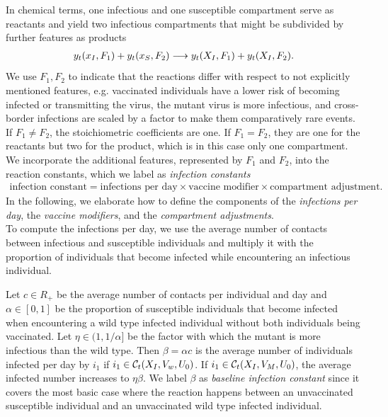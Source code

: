 In chemical terms, one infectious and one susceptible compartment serve as reactants and yield two infectious compartments that might be subdivided by further features as products
\begin{align}
\label{eq:general_infection}
y_t(x_I, F_1) + y_t(x_S, F_2) \longrightarrow y_t(X_I, F_1) + y_t(X_I, F_2).
\end{align}
We use $F_1, F_2$ to indicate that the reactions differ with respect to not explicitly mentioned features, e.g. vaccinated individuals have a lower risk of becoming infected or transmitting the virus, the mutant virus is more infectious, and cross-border infections are scaled by a factor to make them comparatively rare events. If $F_1 \neq F_2$, the stoichiometric coefficients are one. If $F_1=F_2$, they are one for the reactants but two for the product, which is in this case only one compartment. We incorporate the additional features, represented by $F_1$ and $F_2$, into the reaction constants, which we label as \textit{infection constants}
\begin{align*}
\text{infection constant} = \text{infections per day} \times \text{vaccine modifier} \times \text{compartment adjustment}.
\end{align*}
In the following, we elaborate how to define the components of the \textit{infections per day}, the \textit{vaccine modifiers}, and the \textit{compartment adjustments}.\\

To compute the infections per day, we use the average number of contacts between infectious and susceptible individuals and multiply it with the proportion of individuals that become infected while encountering an infectious individual.

Let $c \in R_+$ be the average number of contacts per individual and day and $\alpha \in [0,1]$ be the proportion of susceptible individuals that become infected when encountering a wild type infected individual without both individuals being vaccinated. Let $\eta \in (1, 1/\alpha]$ be the factor with which the mutant is more infectious than the wild type. Then $\beta = \alpha c$ is the average number of individuals infected per day by $i_1$ if $i_1 \in \mathcal{C}_t(X_I, V_w, U_0)$. If $i_1 \in \mathcal{C}_t(X_I, V_M, U_0)$, the average infected number increases to $\eta \beta$. We label $\beta$ as \textit{baseline infection constant} since it covers the most basic case where the reaction happens between an unvaccinated susceptible individual and an unvaccinated wild type infected individual. \\

